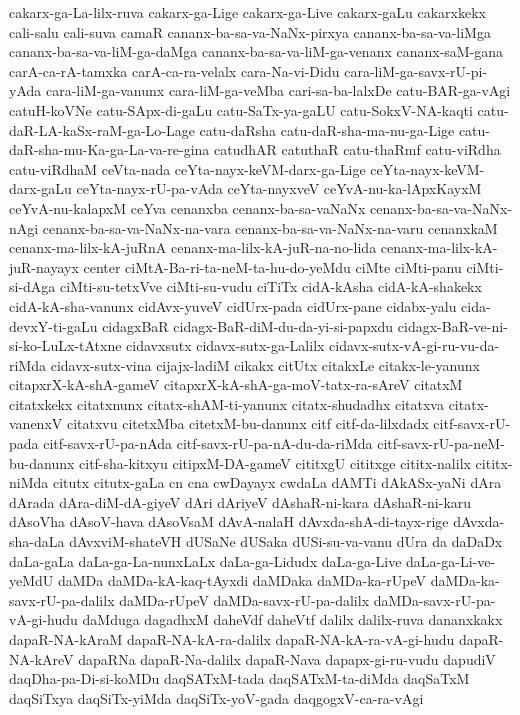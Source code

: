{cakarx-ga-La-lilx-ruva
cakarx-ga-Lige
cakarx-ga-Live
cakarx-gaLu
cakarxkekx
cali-salu
cali-suva
camaR
cananx-ba-sa-va-NaNx-pirxya
cananx-ba-sa-va-liMga
cananx-ba-sa-va-liM-ga-daMga
cananx-ba-sa-va-liM-ga-venanx
cananx-saM-gana
carA-ca-rA-tamxka
carA-ca-ra-velalx
cara-Na-vi-Didu
cara-liM-ga-savx-rU-pi-yAda
cara-liM-ga-vanunx
cara-liM-ga-veMba
cari-sa-ba-lalxDe
catu-BAR-ga-vAgi
catuH-koVNe
catu-SApx-di-gaLu
catu-SaTx-ya-gaLU
catu-SokxV-NA-kaqti
catu-daR-LA-kaSx-raM-ga-Lo-Lage
catu-daRsha
catu-daR-sha-ma-nu-ga-Lige
catu-daR-sha-mu-Ka-ga-La-va-re-gina
catudhAR
catuthaR
catu-thaRmf
catu-viRdha
catu-viRdhaM
ceVta-nada
ceYta-nayx-keVM-darx-ga-Lige
ceYta-nayx-keVM-darx-gaLu
ceYta-nayx-rU-pa-vAda
ceYta-nayxveV
ceYvA-nu-ka-lApxKayxM
ceYvA-nu-kalapxM
ceYva
cenanxba
cenanx-ba-sa-vaNaNx
cenanx-ba-sa-va-NaNx-nAgi
cenanx-ba-sa-va-NaNx-na-vara
cenanx-ba-sa-va-NaNx-na-varu
cenanxkaM
cenanx-ma-lilx-kA-juRnA
cenanx-ma-lilx-kA-juR-na-no-lida
cenanx-ma-lilx-kA-juR-nayayx
center
ciMtA-Ba-ri-ta-neM-ta-hu-do-yeMdu
ciMte
ciMti-panu
ciMti-si-dAga
ciMti-su-tetxVve
ciMti-su-vudu
ciTiTx
cidA-kAsha
cidA-kA-shakekx
cidA-kA-sha-vanunx
cidAvx-yuveV
cidUrx-pada
cidUrx-pane
cidabx-yalu
cida-devxY-ti-gaLu
cidagxBaR
cidagx-BaR-diM-du-da-yi-si-papxdu
cidagx-BaR-ve-ni-si-ko-LuLx-tAtxne
cidavxsutx
cidavx-sutx-ga-Lalilx
cidavx-sutx-vA-gi-ru-vu-da-riMda
cidavx-sutx-vina
cijajx-ladiM
cikakx
citUtx
citakxLe
citakx-le-yanunx
citapxrX-kA-shA-gameV
citapxrX-kA-shA-ga-moV-tatx-ra-sAreV
citatxM
citatxkekx
citatxnunx
citatx-shAM-ti-yanunx
citatx-shudadhx
citatxva
citatx-vanenxV
citatxvu
citetxMba
citetxM-bu-danunx
citf
citf-da-lilxdadx
citf-savx-rU-pada
citf-savx-rU-pa-nAda
citf-savx-rU-pa-nA-du-da-riMda
citf-savx-rU-pa-neM-bu-danunx
citf-sha-kitxyu
citipxM-DA-gameV
cititxgU
cititxge
cititx-nalilx
cititx-niMda
citutx
citutx-gaLa
cn
cna
cwDayayx
cwdaLa
dAMTi
dAkASx-yaNi
dAra
dArada
dAra-diM-dA-giyeV
dAri
dAriyeV
dAshaR-ni-kara
dAshaR-ni-karu
dAsoVha
dAsoV-hava
dAsoVsaM
dAvA-nalaH
dAvxda-shA-di-tayx-rige
dAvxda-sha-daLa
dAvxviM-shateVH
dUSaNe
dUSaka
dUSi-su-va-vanu
dUra
da
daDaDx
daLa-gaLa
daLa-ga-La-nunxLaLx
daLa-ga-Lidudx
daLa-ga-Live
daLa-ga-Li-ve-yeMdU
daMDa
daMDa-kA-kaq-tAyxdi
daMDaka
daMDa-ka-rUpeV
daMDa-ka-savx-rU-pa-dalilx
daMDa-rUpeV
daMDa-savx-rU-pa-dalilx
daMDa-savx-rU-pa-vA-gi-hudu
daMduga
dagadhxM
daheVdf
daheVtf
dalilx
dalilx-ruva
dananxkakx
dapaR-NA-kAraM
dapaR-NA-kA-ra-dalilx
dapaR-NA-kA-ra-vA-gi-hudu
dapaR-NA-kAreV
dapaRNa
dapaR-Na-dalilx
dapaR-Nava
dapapx-gi-ru-vudu
dapudiV
daqDha-pa-Di-si-koMDu
daqSATxM-tada
daqSATxM-ta-diMda
daqSaTxM
daqSiTxya
daqSiTx-yiMda
daqSiTx-yoV-gada
daqgogxV-ca-ra-vAgi
}
